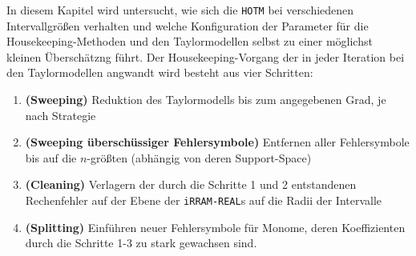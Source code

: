 In diesem Kapitel wird untersucht, wie sich die \verb+HOTM+ bei verschiedenen Intervallgrößen verhalten und welche Konfiguration der Parameter für die Housekeeping-Methoden und den Taylormodellen selbst zu einer möglichst kleinen Überschätzng führt.
Der Housekeeping-Vorgang der in jeder Iteration bei den Taylormodellen angwandt wird besteht aus vier Schritten:
 \begin{enumerate}
  \item \textbf{(Sweeping)} Reduktion des Taylormodells bis zum angegebenen Grad, je nach Strategie
  \item \textbf{(Sweeping überschüssiger Fehlersymbole)} Entfernen aller Fehlersymbole bis auf die $n$-größten (abhängig von deren Support-Space)
  \item \textbf{(Cleaning)} Verlagern der durch die Schritte 1 und 2 entstandenen Rechenfehler auf der Ebene der \verb+iRRAM-REAL+s auf die Radii der Intervalle
  \item \textbf{(Splitting)} Einführen neuer Fehlersymbole für Monome, deren Koeffizienten durch die Schritte 1-3 zu stark gewachsen sind.
 \end{enumerate}

% 
% 




